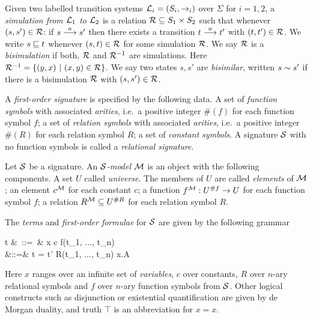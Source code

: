 Given two labelled transition systems $\mathcal{L}_i = (S_i, \rightarrow_i)$
over $\Sigma$ for $i = 1, 2$, a \emph{simulation from $\mathcal{L}_1$ to
  $\mathcal{L}_2$} is a relation $\mathcal{R} \subseteq S_1 \times S_2$ such that
whenever $(s, s') \in \mathcal{R}$: if $s \stackrel{a}{\longrightarrow} s'$ then there exists a
transition $t \stackrel{a}{\longrightarrow} t'$ with $(t, t') \in \mathcal{R}$.  We write $s \sqsubseteq
t$ whenever $(s, t) \in \mathcal{R}$ for some simulation $\mathcal{R}$.  We say
$\mathcal{R}$ is a \emph{bisimulation} if both, $\mathcal{R}$ and $\mathcal{R}^{-1}$ are
simulations. Here $\mathcal{R}^{-1} = \{(y, x)\ |\ (x, y) \in \mathcal{R}\}$.  We
say two states $s, s'$ are \emph{bisimilar}, written $s \sim s'$ if
there is a bisimulation $\mathcal{R}$ with $(s, s') \in \mathcal{R}$.

A \emph{first-order signature} is specified by the following data.
 A set of \emph{function symbols} with associated \emph{arities},
i.e.~a positive integer $\#(f)$ for each function symbol $f$;  a
set of \emph{relation symbols} with associated \emph{arities}, i.e.~a
positive integer $\#(R)$ for each relation symbol $R$;  a set of
\emph{constant symbols}.  A signature $\mathcal{S}$ with no function symbols
is called a \emph{relational signature}.

Let $\mathcal{S}$ be a signature. An \emph{$\mathcal{S}$-model} $\mathcal{M}$ is an
object with the following components.  A set $U$ called
\emph{universe}.  The members of $U$ are called \emph{elements} of
$\mathcal{M}$; an element $c^{\mathcal{M}}$ for each constant $c$; a function
$f^{\mathcal{M}} : U^{\#f} \rightarrow U$ for each function symbol $f$; a
relation $R^{\mathcal{M}} \subseteq U^{\#R}$ for each relation symbol $R$.

The \emph{terms} and \emph{first-order formulae} for $\mathcal{S}$ are given
by the following grammar
\begin{GRAMMAR}
  t &\ ::=\ & x \VERTICAL c \VERTICAL f(t_1, ..., t_n) \\[1mm]
  \phi &::=& t = t' \VERTICAL R(t_1, ..., t_n) \VERTICAL \neg \phi \VERTICAL \phi \AND \psi \VERTICAL \forall x.A
\end{GRAMMAR}

\NI Here $x$ ranges over an infinite set of \emph{variables}, $c$ over
constants, $R$ over $n$-ary relational symbols and $f$ over $n$-ary
function symbols from $\mathcal{S}$.  Other logical constructs such as
disjunction or existential quantification are given by de Morgan
duality, and truth $\top$ is an abbreviation for $x = x$.


